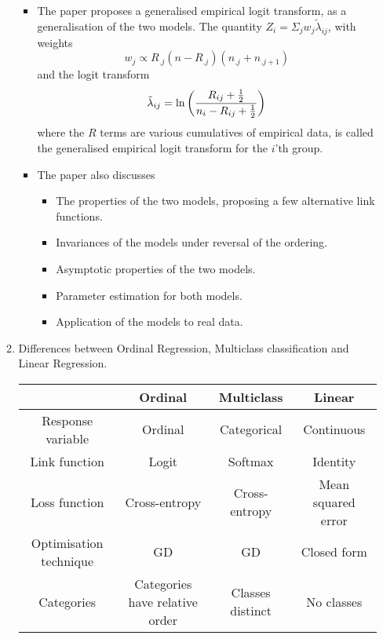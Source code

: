 \documentclass[reqno]{amsart}
\begin{document}
\begin{enumerate}[label=\textbf{(\Roman*)}]
\begin{enumerate}[label=\textbf{(\alph*)}]
\begin{itemize}
                \item The paper proposes a generalised empirical logit transform, as a generalisation of the two models. The quantity \(Z_{i} = \Sigma_j w_j \tilde{\lambda}_{ij}\), with 
                weights
                \[w_j \propto R_{.j}(n - R_{.j})(n_{.j} + n_{.j+1})\]
                and the logit transform
                \[\tilde{\lambda}_{ij} = \ln \left(\frac{R_{ij} + \frac{1}{2}}{n_i - R_{ij} + \frac{1}{2}}\right)\]
                where the \(R\) terms are various cumulatives of empirical data, is called the generalised empirical logit transform for the \(i\)'th group.
                
                \item The paper also discusses \begin{itemize}
                    \item The properties of the two models, proposing a few alternative link functions.
                    \item Invariances of the models under reversal of the ordering.
                    \item Asymptotic properties of the two models.
                    \item Parameter estimation for both models.
                    \item Application of the models to real data.
                \end{itemize} 
            \end{itemize}
            \item Differences between Ordinal Regression, Multiclass classification and Linear Regression.
    
           \begin{center}
             \begin{tabular}{|c|c|c|c|}
                \hline
                &Ordinal & Multiclass & Linear \\
                \hline
                Response variable & Ordinal & Categorical & Continuous \\
                Link function & Logit & Softmax & Identity \\
                Loss function & Cross-entropy & Cross-entropy & Mean squared error \\
                Optimisation technique & GD & GD & Closed form \\
                Categories & Categories have relative order & Classes distinct & No classes \\ 
                \hline
             \end{tabular}
           \end{center}


\end{enumerate}
\end{enumerate}
\end{document}

